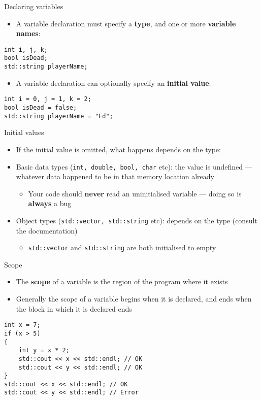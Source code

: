 \begin{frame}[fragile]{Declaring variables}
	\begin{itemize}
		\item A variable declaration must specify a \textbf{type}, and one or more \textbf{variable names}:
	\end{itemize}
	\begin{lstlisting}
int i, j, k;
bool isDead;
std::string playerName;
	\end{lstlisting}
	\pause
	\begin{itemize}
		\item A variable declaration can optionally specify an \textbf{initial value}:
	\end{itemize}
	\begin{lstlisting}
int i = 0, j = 1, k = 2;
bool isDead = false;
std::string playerName = "Ed";
	\end{lstlisting}
\end{frame}

\begin{frame}[fragile]{Initial values}
	\begin{itemize}
		\item If the initial value is omitted, what happens depends on the type: \pause
		\item Basic data types (\lstinline{int, double, bool, char} etc): the value is undefined --- whatever data happened
		to be in that memory location already \pause
		\begin{itemize}
			\item Your code should \textbf{never} read an uninitialised variable --- doing so is \textbf{always} a bug \pause
		\end{itemize}
		\item Object types (\lstinline{std::vector, std::string} etc): depends on the type (consult the documentation) \pause
		\begin{itemize}
			\item \lstinline{std::vector} and \lstinline{std::string} are both initialised to empty
		\end{itemize}
	\end{itemize}
\end{frame}

\begin{frame}[fragile]{Scope}
	\begin{itemize}
		\item The \textbf{scope} of a variable is the region of the program where it exists \pause
		\item Generally the scope of a variable begins when it is declared,
		and ends when the block in which it is declared ends \pause
	\end{itemize}
	\begin{lstlisting}
int x = 7;
if (x > 5)
{
    int y = x * 2;
    std::cout << x << std::endl; // OK
    std::cout << y << std::endl; // OK
}
std::cout << x << std::endl; // OK
std::cout << y << std::endl; // Error
	\end{lstlisting}
\end{frame}
